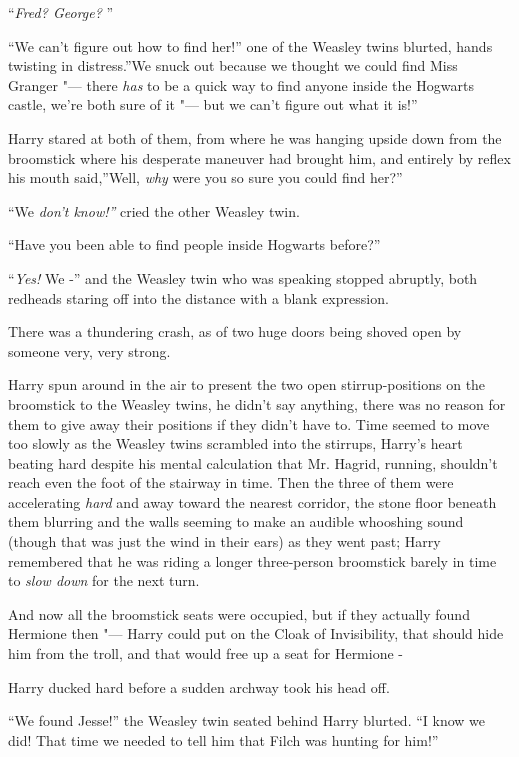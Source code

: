 ``\emph{Fred? George?} ''

``We can't figure out how to find her!'' one of the Weasley twins
blurted, hands twisting in distress.''We snuck out because we thought we
could find Miss Granger "--- there \emph{has} to be a quick way to find
anyone inside the Hogwarts castle, we're both sure of it "--- but we can't
figure out what it is!''

Harry stared at both of them, from where he was hanging upside down from
the broomstick where his desperate maneuver had brought him, and
entirely by reflex his mouth said,''Well, \emph{why} were you so sure
you could find her?''

``We \emph{don't know!''} cried the other Weasley twin.

``Have you been able to find people inside Hogwarts before?''

``\emph{Yes!} We -'' and the Weasley twin who was speaking stopped
abruptly, both redheads staring off into the distance with a blank
expression.

There was a thundering crash, as of two huge doors being shoved open by
someone very, very strong.

Harry spun around in the air to present the two open stirrup-positions
on the broomstick to the Weasley twins, he didn't say anything, there
was no reason for them to give away their positions if they didn't have
to. Time seemed to move too slowly as the Weasley twins scrambled into
the stirrups, Harry's heart beating hard despite his mental calculation
that Mr. Hagrid, running, shouldn't reach even the foot of the stairway
in time. Then the three of them were accelerating \emph{hard} and away
toward the nearest corridor, the stone floor beneath them blurring and
the walls seeming to make an audible whooshing sound (though that was
just the wind in their ears) as they went past; Harry remembered that he
was riding a longer three-person broomstick barely in time to \emph{slow
down} for the next turn.

And now all the broomstick seats were occupied, but if they actually
found Hermione then "--- Harry could put on the Cloak of Invisibility, that
should hide him from the troll, and that would free up a seat for
Hermione -

Harry ducked hard before a sudden archway took his head off.

``We found Jesse!'' the Weasley twin seated behind Harry blurted. ``I
know we did! That time we needed to tell him that Filch was hunting for
him!''

